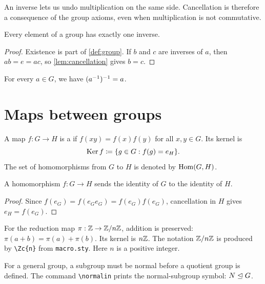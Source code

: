 \documentclass[../../main.tex]{subfiles}
\begin{document}
\begin{bigidea}\label{idea:cancellation}
An inverse lets us undo multiplication on the same side. Cancellation is
therefore a consequence of the group axioms, even when multiplication is
not commutative.
\end{bigidea}

\begin{theorem}\label{thm:unique-inverse}
Every element of a group has exactly one inverse.
\end{theorem}
\begin{proof}
Existence is part of \cref{def:group}. If $b$ and $c$ are inverses of $a$,
then $ab=e=ac$, so \cref{lem:cancellation} gives $b=c$.
\end{proof}

\begin{corollary}
For every $a\in G$, we have $(a^{-1})^{-1}=a$.
\end{corollary}

\section{Maps between groups}
\begin{definition}[Homomorphism]\label{def:homomorphism}
A map $f:G\to H$ is a  if
$f(xy)=f(x)f(y)$ for all $x,y\in G$. Its kernel is
\[
  \operatorname{Ker} f\coloneqq\{g\in G:f(g)=e_H\}.
\]
The set of homomorphisms from $G$ to $H$ is denoted by $\operatorname{Hom}(G,H)$.
\end{definition}

\begin{prop}\label{prop:identity-map}
A homomorphism $f:G\to H$ sends the identity of $G$ to the identity of $H$.
\end{prop}
\begin{proof}
Since $f(e_G)=f(e_Ge_G)=f(e_G)f(e_G)$, cancellation in $H$ gives
$e_H=f(e_G)$.
\end{proof}

\begin{explanation}
For the reduction map $\pi:\mathbb Z\to\mathbb Z/n\mathbb Z$, addition is preserved:
$\pi(a+b)=\pi(a)+\pi(b)$. Its kernel is $n\mathbb Z$. The notation
$\mathbb Z/n\mathbb Z$ is produced by \verb|\Zc{n}| from \texttt{macro.sty}.
Here $n$ is a positive integer.
\end{explanation}

\begin{remark}
For a general group, a subgroup must be normal before a quotient group is
defined. The command \verb|\normalin| prints the normal-subgroup symbol:
$N\trianglelefteq G$.
\end{remark}
\end{document}
